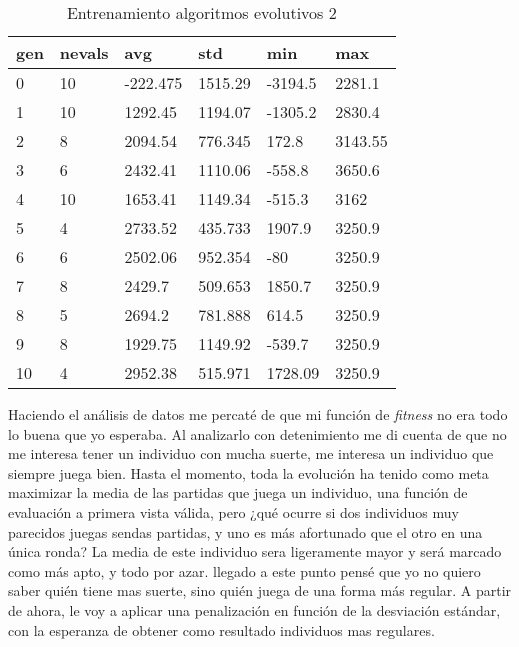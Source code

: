 \begin{table}[]
\centering
\begin{tabular}{|l|l|l|l|l|l|}
\hline
\rowcolor[HTML]{EFEFEF} 
gen & nevals & avg      & std     & min     & max                              \\ \hline
0   & 10     & -222.475 & 1515.29 & -3194.5 & 2281.1                           \\ \hline
1   & 10     & 1292.45  & 1194.07 & -1305.2 & 2830.4                           \\ \hline
2   & 8      & 2094.54  & 776.345 & 172.8   & 3143.55                          \\ \hline
3   & 6      & 2432.41  & 1110.06 & -558.8  & 3650.6                           \\ \hline
4   & 10     & 1653.41  & 1149.34 & -515.3  & 3162                             \\ \hline
5   & 4      & 2733.52  & 435.733 & 1907.9  & 3250.9                           \\ \hline
6   & 6      & 2502.06  & 952.354 & -80     & 3250.9                           \\ \hline
7   & 8      & 2429.7   & 509.653 & 1850.7  & 3250.9                           \\ \hline
8   & 5      & 2694.2   & 781.888 & 614.5   & 3250.9                           \\ \hline
9   & 8      & 1929.75  & 1149.92 & -539.7  & 3250.9                           \\ \hline
10  & 4      & 2952.38  & 515.971 & 1728.09 & 3250.9 
\\ \hline
\end{tabular}
\caption{Entrenamiento algoritmos evolutivos 2}
\label{tab:entr2}
\end{table}



Haciendo el análisis de datos me percaté de que mi función de \emph{fitness} no era todo lo buena que yo esperaba. Al analizarlo con detenimiento me di cuenta de que no me interesa tener un individuo con mucha suerte, me interesa un individuo que siempre juega bien. Hasta el momento, toda la evolución ha tenido como meta maximizar la media de las partidas que juega un individuo, una función de evaluación a primera vista válida, pero ¿qué ocurre si dos individuos muy parecidos juegas sendas partidas, y uno es más afortunado que el otro en una única ronda? La media de este individuo sera ligeramente mayor y será marcado como más apto, y todo por azar. llegado a este punto pensé que yo no quiero saber quién tiene mas suerte, sino quién juega de una forma más regular. A partir de ahora, le voy a aplicar una penalización en función de la desviación estándar, con la esperanza de obtener como resultado individuos mas regulares.


